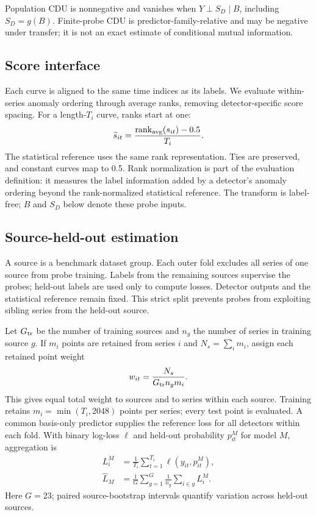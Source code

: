 Population CDU is nonnegative and vanishes when $Y\perp S_D\mid B$, including $S_D=g(B)$. Finite-probe CDU is predictor-family-relative and may be negative under transfer; it is not an exact estimate of conditional mutual information.

\subsection{Score interface}
Each curve is aligned to the same time indices as its labels. We evaluate within-series anomaly ordering through average ranks, removing detector-specific score spacing. For a length-$T_i$ curve, ranks start at one:
\begin{equation}
\widetilde s_{it}=\frac{\operatorname{rank}_{\rm avg}(s_{it})-0.5}{T_i}.
\end{equation}
The statistical reference uses the same rank representation. Ties are preserved, and constant curves map to 0.5. Rank normalization is part of the evaluation definition: it measures the label information added by a detector's anomaly ordering beyond the rank-normalized statistical reference. The transform is label-free; $B$ and $S_D$ below denote these probe inputs.

\subsection{Source-held-out estimation}
A source is a benchmark dataset group. Each outer fold excludes all series of one source from probe training. Labels from the remaining sources supervise the probes; held-out labels are used only to compute losses. Detector outputs and the statistical reference remain fixed. This strict split prevents probes from exploiting sibling series from the held-out source.

Let $G_{\rm tr}$ be the number of training sources and $n_g$ the number of series in training source $g$. If $m_i$ points are retained from series $i$ and $N_s=\sum_i m_i$, assign each retained point weight
\begin{equation}
w_{it}=\frac{N_s}{G_{\rm tr}n_gm_i}.
\end{equation}
This gives equal total weight to sources and to series within each source. Training retains $m_i=\min(T_i,2048)$ points per series; every test point is evaluated. A common basis-only predictor supplies the reference loss for all detectors within each fold. With binary log-loss $\ell$ and held-out probability $p_{it}^M$ for model $M$, aggregation is
\begin{equation}
\begin{aligned}
L_i^M&=\frac{1}{T_i}\sum_{t=1}^{T_i}\ell(y_{it},p_{it}^M),\\
\widehat L_M&=\frac{1}{G}\sum_{g=1}^{G}\frac{1}{n_g}\sum_{i\in g}L_i^M.
\end{aligned}
\end{equation}
Here $G=23$; paired source-bootstrap intervals quantify variation across held-out sources.

